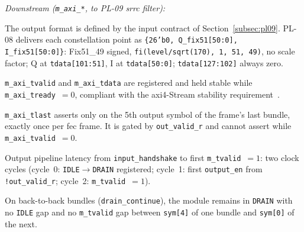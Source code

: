 \textit{Downstream (\texttt{m\_axi\_*}, to PL-09 \ac{srrc} filter):}
\begin{tightemize}
  \item The output format is defined by the input contract of
        Section~\ref{subsec:pl09}.
        PL-08 delivers each constellation point as
        \texttt{\{26'b0, Q\_fix51[50:0], I\_fix51[50:0]\}}: Fix51\_49
        signed, \texttt{fi(level/sqrt(170), 1, 51, 49)}, no scale
        factor; Q at \texttt{tdata[101:51]}, I at \texttt{tdata[50:0]};
        \texttt{tdata[127:102]} always zero.
  \item \texttt{m\_axi\_tvalid} and \texttt{m\_axi\_tdata} are
        registered and held stable while \texttt{m\_axi\_tready}~$= 0$,
        compliant with the \ac{axi}4-Stream stability
        requirement~\cite{ARM_IHI0022}.
  \item \texttt{m\_axi\_tlast} asserts only on the 5th output symbol
        of the frame's last bundle, exactly once per \ac{fec} frame.
        It is gated by \texttt{out\_valid\_r} and cannot assert while
        \texttt{m\_axi\_tvalid}~$= 0$.
  \item Output pipeline latency from \texttt{input\_handshake} to first
        \texttt{m\_tvalid}~$= 1$: two clock cycles (cycle~0:
        \texttt{IDLE}$\to$\texttt{DRAIN} registered; cycle~1: first
        \texttt{output\_en} from \texttt{!out\_valid\_r};
        cycle~2: \texttt{m\_tvalid}~$= 1$).
  \item On back-to-back bundles (\texttt{drain\_continue}), the module
        remains in \texttt{DRAIN} with no \texttt{IDLE} gap and no
        \texttt{m\_tvalid} gap between \texttt{sym[4]} of one bundle
        and \texttt{sym[0]} of the next.
\end{tightemize}


\FloatBarrier
